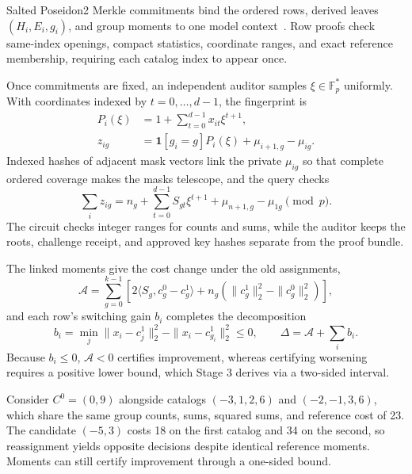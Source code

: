 \documentclass[5p,times,twocolumn]{elsarticle}
\begin{document}
Salted Poseidon2 Merkle commitments bind the ordered rows, derived leaves $(H_i,E_i,g_i)$, and group moments to one model context~\cite{poseidon22023}. Row proofs check same-index openings, compact statistics, coordinate ranges, and exact reference membership, requiring each catalog index to appear once.

Once commitments are fixed, an independent auditor samples $\xi\in\mathbb F_p^*$ uniformly. With coordinates indexed by $t=0,\ldots,d-1$, the fingerprint is
\begin{align}
 P_i(\xi)&=1+\sum_{t=0}^{d-1}x_{it}\xi^{t+1},\nonumber\\
 z_{ig}&=\mathbf1[g_i=g]P_i(\xi)+\mu_{i+1,g}-\mu_{ig}.
 \label{eq:methodology-fingerprint}
\end{align}
Indexed hashes of adjacent mask vectors link the private $\mu_{ig}$ so that complete ordered coverage makes the masks telescope, and the query checks
\begin{equation}
 \sum_i z_{ig}=n_g+\sum_{t=0}^{d-1}S_{gt}\xi^{t+1}
                    +\mu_{n+1,g}-\mu_{1g}\pmod p.
 \label{eq:methodology-moment-link}
\end{equation}
The circuit checks integer ranges for counts and sums, while the auditor keeps the roots, challenge receipt, and approved key hashes separate from the proof bundle.

The linked moments give the cost change under the old assignments,
\begin{equation}
 \mathcal A=
 \sum_{g=0}^{k-1}\left[
 2\langle S_g,c^0_g-c^1_g\rangle
 +n_g(\|c^1_g\|_2^2-\|c^0_g\|_2^2)\right],
 \label{eq:methodology-assigned}
\end{equation}
and each row's switching gain $b_i$ completes the decomposition
\begin{equation}
 b_i=\min_j\|x_i-c^1_j\|_2^2-\|x_i-c^1_{g_i}\|_2^2\leq0,
 \qquad \Delta=\mathcal A+\sum_i b_i.
 \label{eq:methodology-decomposition}
\end{equation}
Because $b_i\leq0$, $\mathcal A<0$ certifies improvement, whereas certifying worsening requires a positive lower bound, which Stage 3 derives via a two-sided interval.

Consider $C^0=(0,9)$ alongside catalogs $(-3,1,2,6)$ and $(-2,-1,3,6)$, which share the same group counts, sums, squared sums, and reference cost of 23. The candidate $(-5,3)$ costs 18 on the first catalog and 34 on the second, so reassignment yields opposite decisions despite identical reference moments. Moments can still certify improvement through a one-sided bound.
\end{document}
